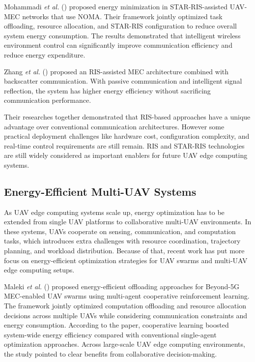 \documentclass[a4paper, 12pt]{article}
\begin{document}
Mohammadi \textit{et al.} (\cite{Mohammadi2026}) proposed energy minimization in STAR-RIS-assisted UAV-MEC networks that use NOMA. Their framework jointly optimized task offloading, resource allocation, and STAR-RIS configuration to reduce overall system energy consumption. The results demonstrated that intelligent wireless environment control can significantly improve communication efficiency and reduce energy expenditure.

Zhang \textit{et al.} (\cite{Zhang2026RIS}) proposed an RIS-assisted MEC architecture combined with backscatter communication. With passive communication and intelligent signal reflection, the system has higher energy efficiency without sacrificing communication performance.

Their researches together demonstrated that RIS-based approaches have a unique advantage over conventional communication architectures. However some practical deployment challenges like hardware cost, configuration complexity, and real-time control requirements are still remain. RIS and STAR-RIS technologies are still widely considered as important enablers for future UAV edge computing systems.

\subsection*{Energy-Efficient Multi-UAV Systems}
As UAV edge computing systems scale up, energy optimization has to be extended from single UAV platforms to collaborative multi-UAV environments. In these systems, UAVs cooperate on sensing, communication, and computation tasks, which introduces extra challenges with resource coordination, trajectory planning, and workload distribution. Because of that, recent work has put more focus on energy-efficient optimization strategies for UAV swarms and multi-UAV edge computing setups.

Maleki \textit{et al.} (\cite{Maleki2026}) proposed energy-efficient offloading approaches for Beyond-5G MEC-enabled UAV swarms using multi-agent cooperative reinforcement learning. The framework jointly optimized computation offloading and resource allocation decisions across multiple UAVs while considering communication constraints and energy consumption. According to the paper, cooperative learning boosted system-wide energy efficiency compared with conventional single-agent optimization approaches. Across large-scale UAV edge computing environments, the study pointed to clear benefits from collaborative decision-making.
\end{document}
